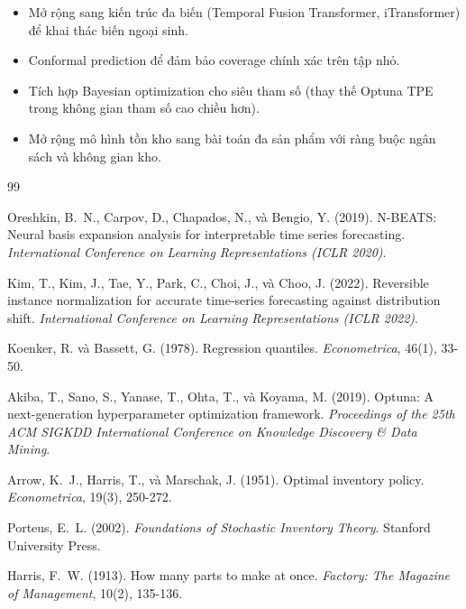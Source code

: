 \documentclass[12pt, a4paper]{report}
\begin{document}
\begin{itemize}
  \item Mở rộng sang kiến trúc đa biến (Temporal Fusion Transformer, iTransformer) để khai thác biến ngoại sinh.
  \item Conformal prediction để đảm bảo coverage chính xác trên tập nhỏ.
  \item Tích hợp Bayesian optimization cho siêu tham số (thay thế Optuna TPE trong không gian tham số cao chiều hơn).
  \item Mở rộng mô hình tồn kho sang bài toán đa sản phẩm với ràng buộc ngân sách và không gian kho.
\end{itemize}


\begin{thebibliography}{99}

Oreshkin, B.~N., Carpov, D., Chapados, N., và Bengio, Y. (2019).
\newblock N-BEATS: Neural basis expansion analysis for interpretable time series forecasting.
\newblock \textit{International Conference on Learning Representations (ICLR 2020)}.

Kim, T., Kim, J., Tae, Y., Park, C., Choi, J., và Choo, J. (2022).
\newblock Reversible instance normalization for accurate time-series forecasting against distribution shift.
\newblock \textit{International Conference on Learning Representations (ICLR 2022)}.

Koenker, R. và Bassett, G. (1978).
\newblock Regression quantiles.
\newblock \textit{Econometrica}, 46(1), 33-50.

Akiba, T., Sano, S., Yanase, T., Ohta, T., và Koyama, M. (2019).
\newblock Optuna: A next-generation hyperparameter optimization framework.
\newblock \textit{Proceedings of the 25th ACM SIGKDD International Conference on Knowledge Discovery \& Data Mining}.

Arrow, K.~J., Harris, T., và Marschak, J. (1951).
\newblock Optimal inventory policy.
\newblock \textit{Econometrica}, 19(3), 250-272.

Porteus, E.~L. (2002).
\newblock \textit{Foundations of Stochastic Inventory Theory}.
\newblock Stanford University Press.

Harris, F.~W. (1913).
\newblock How many parts to make at once.
\newblock \textit{Factory: The Magazine of Management}, 10(2), 135-136.


\end{thebibliography}
\end{document}

